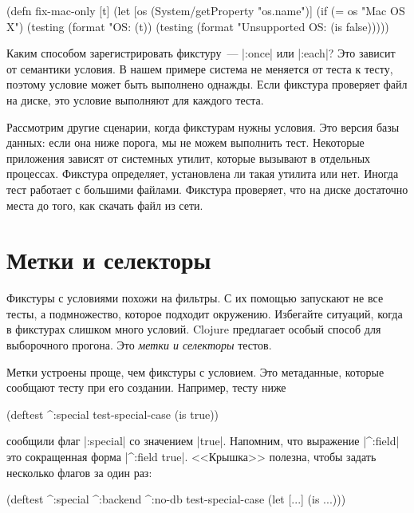 \begin{english}
  \begin{clojure}
(defn fix-mac-only [t]
  (let [os (System/getProperty "os.name")]
    (if (= os "Mac OS X")
      (testing (format "OS: %
        (t))
      (testing (format "Unsupported OS: %
        (is false)))))
  \end{clojure}
\end{english}

Каким способом зарегистрировать фикстуру~--- \spverb|:once| или \spverb|:each|?
Это зависит от семантики условия. В нашем примере система не меняется от теста к
тесту, поэтому условие может быть выполнено однажды. Если фикстура проверяет
файл на диске, это условие выполняют для каждого теста.

Рассмотрим другие сценарии, когда фикстурам нужны условия. Это версия базы
данных: если она ниже порога, мы не можем выполнить тест. Некоторые приложения
зависят от системных утилит, которые вызывают в отдельных процессах. Фикстура
определяет, установлена ли такая утилита или нет. Иногда тест работает с
большими файлами. Фикстура проверяет, что на диске достаточно места до того, как
скачать файл из сети.

\section{Метки и селекторы}

Фикстуры с условиями похожи на фильтры. С их помощью запускают не все тесты, а
подмножество, которое подходит окружению. Избегайте ситуаций, когда в фикстурах
слишком много условий. Clojure предлагает особый способ для выборочного
прогона. Это \emph{метки и селекторы} тестов.

Метки устроены проще, чем фикстуры с условием. Это метаданные, которые сообщают
тесту при его создании. Например, тесту ниже

\begin{english}
  \begin{clojure}
(deftest ^:special test-special-case
  (is true))
  \end{clojure}
\end{english}

\noindent
сообщили флаг \spverb|:special| со значением \spverb|true|. Напомним, что
выражение \spverb|^:field| это сокращенная форма \spverb|^{:field true}|.
<<Крышка>> полезна, чтобы задать несколько флагов за один раз:

\begin{english}
  \begin{clojure}
(deftest ^:special ^:backend ^:no-db
  test-special-case
  (let [...]
    (is ...)))
  \end{clojure}
\end{english}

